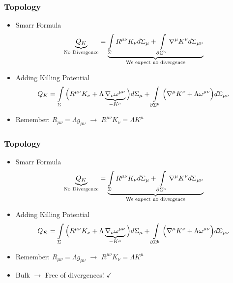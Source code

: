 \documentclass[t]{beamer}
\begin{document}
\begin{frame}
\frametitle{Topology}
\begin{itemize}
\setlength{\parskip}{8pt}
\item Smarr Formula
\begin{align}
\underbrace{Q_{K}}_{\text{No Divergence}} = \underbrace{\int\limits_{\Sigma} R^{\mu\nu} K_\nu d\Sigma_{\mu} + \int\limits_{\partial \Sigma^{\text{h}}} \nabla^{\mu} K^{\nu} d\Sigma_{\mu\nu}}_{\text{We expect no divergence}} \notag
\end{align}

\item Adding Killing Potential
\begin{align}
Q_{K} = \int\limits_{\Sigma} \Big( R^{\mu\nu} K_\nu + \Lambda \underbrace{\nabla_\nu \omega^{\mu\nu}}_{-K^\mu} \Big) d\Sigma_{\mu} + \int\limits_{\partial \Sigma^{\text{h}}} \Big( \nabla^{\mu} K^{\nu} + \Lambda \omega^{\mu\nu} \Big) d\Sigma_{\mu\nu} \notag
\end{align}

\item Remember: $R_{\mu\nu} = \Lambda g_{\mu\nu}$ $\rightarrow$ $R^{\mu\nu} K_\nu = \Lambda K^\mu $

\end{itemize}

\end{frame}

\begin{frame}
\frametitle{Topology}
\begin{itemize}
\setlength{\parskip}{8pt}
\item Smarr Formula
\begin{align}
\underbrace{Q_{K}}_{\text{No Divergence}} = \underbrace{\int\limits_{\Sigma} R^{\mu\nu} K_\nu d\Sigma_{\mu} + \int\limits_{\partial \Sigma^{\text{h}}} \nabla^{\mu} K^{\nu} d\Sigma_{\mu\nu}}_{\text{We expect no divergence}} \notag
\end{align}

\item Adding Killing Potential
\begin{align}
Q_{K} = \int\limits_{\Sigma} \Big( R^{\mu\nu} K_\nu + \Lambda \underbrace{\nabla_\nu \omega^{\mu\nu}}_{-K^\mu} \Big) d\Sigma_{\mu} + \int\limits_{\partial \Sigma^{\text{h}}} \Big( \nabla^{\mu} K^{\nu} + \Lambda \omega^{\mu\nu} \Big) d\Sigma_{\mu\nu} \notag
\end{align}

\item Remember: $R_{\mu\nu} = \Lambda g_{\mu\nu}$ $\rightarrow$ $R^{\mu\nu} K_\nu = \Lambda K^\mu $

\item Bulk $\rightarrow$ Free of divergences! $\checkmark$
\end{itemize}

\end{frame}
\end{document}
